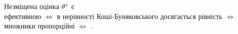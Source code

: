 \vspace*{-2em}
\begin{consequence}
Незміщена оцінка $\theta^*$ є\\ ефективною $\Longleftrightarrow$ в нерівності Коші-Буняковського досягається рівність $\Longleftrightarrow$ множники пропорційні $\Longleftrightarrow$
.
\end{consequence}
